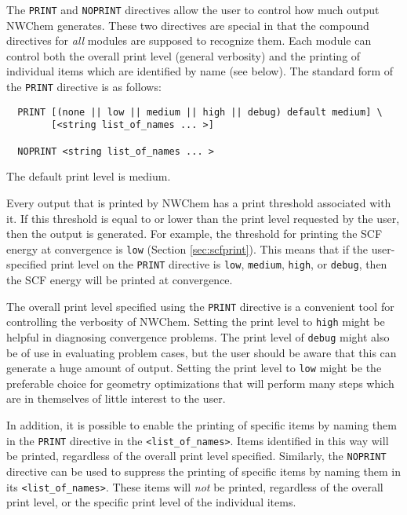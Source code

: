The \verb+PRINT+ and \verb+NOPRINT+ directives allow the user to
control how much output NWChem generates.  These two directives are
special in that the compound directives for {\em all} modules are
supposed to recognize them. Each module can control both the overall
print level (general verbosity) and the printing of individual items
which are identified by name (see below).  The standard form of the
\verb+PRINT+ directive is as follows:

\begin{verbatim}
  PRINT [(none || low || medium || high || debug) default medium] \
        [<string list_of_names ... >]

  NOPRINT <string list_of_names ... >
\end{verbatim}
The default print level is medium.

Every output that is printed by NWChem has a print threshold
associated with it. If this threshold is equal to or lower than the
print level requested by the user, then the output is generated.  For
example, the threshold for printing the SCF energy at convergence is
\verb+low+ (Section \ref{sec:scfprint}).  This means that if the
user-specified print level on the \verb+PRINT+ directive is
\verb+low+, \verb+medium+, \verb+high+, or \verb+debug+, then the SCF
energy will be printed at convergence.

The overall print level specified
using the \verb+PRINT+ directive is a convenient tool for controlling 
the verbosity
of NWChem. Setting the print level to \verb+high+ might be helpful in
diagnosing convergence problems.  The print level of \verb+debug+ might
also be of use in evaluating problem cases, but the user should be aware
that this can generate a huge amount of output.  Setting the print level
to \verb+low+ might be the preferable choice for geometry
optimizations that will perform many steps which are in themselves of
little interest to the user.

In addition, it is possible to enable the printing of specific
items by naming them in the \verb+PRINT+ directive in the 
\verb+<list_of_names>+.  Items identified in this way will be printed, 
regardless of the overall print level specified.  Similarly, the 
\verb+NOPRINT+ directive can be used to suppress the printing of specific
items by naming them in its \verb+<list_of_names>+.  These items will
{\em not} be printed, regardless of the overall print level, or the 
specific print level of the individual items.

